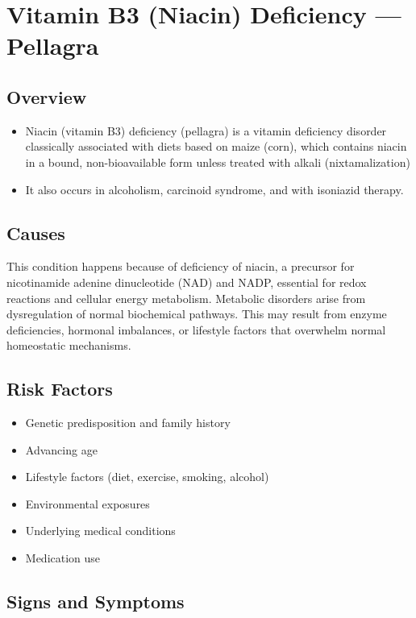 \chapter{Vitamin B3 (Niacin) Deficiency --- Pellagra}
\label{sec:Vitamin B3 Deficiency}

\section{Overview}


\begin{itemize}[noitemsep]
  \item Niacin (vitamin B3) deficiency (pellagra) is a vitamin deficiency disorder classically associated with diets based on maize (corn), which contains niacin in a bound, non-bioavailable form unless treated with alkali (nixtamalization)
  \item It also occurs in alcoholism, carcinoid syndrome, and with isoniazid therapy.
\end{itemize}
\section{Causes}
This condition happens because of deficiency of niacin, a precursor for nicotinamide adenine dinucleotide (NAD) and NADP, essential for redox reactions and cellular energy metabolism. Metabolic disorders arise from dysregulation of normal biochemical pathways. This may result from enzyme deficiencies, hormonal imbalances, or lifestyle factors that overwhelm normal homeostatic mechanisms.   
\section{Risk Factors}
\begin{itemize}[noitemsep]
  \item Genetic predisposition and family history
  \item Advancing age
  \item Lifestyle factors (diet, exercise, smoking, alcohol)
  \item Environmental exposures
  \item Underlying medical conditions
  \item Medication use
\end{itemize}
\section{Signs and Symptoms}
